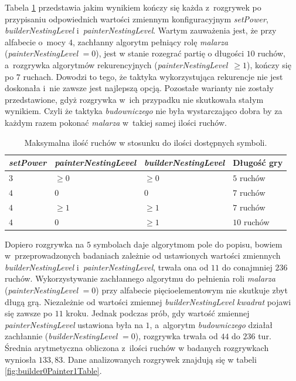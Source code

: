 \documentclass[document]{xmgr}
\begin{document}
Tabela \ref{fig:maxGameLength} przedstawia jakim wynikiem kończy się każda z~rozgrywek po przypisaniu odpowiednich wartości zmiennym konfiguracyjnym \emph{setPower}, \emph{builderNestingLevel} i~\emph{painterNestingLevel}. Wartym zauważenia jest, że przy alfabecie o~mocy $4$, zachłanny algorytm pełniący rolę \emph{malarza} (\emph{painterNestingLevel} $=0$), jest w stanie rozegrać partię o długości $10$ ruchów, a~rozgrywka algorytmów rekurencyjnych \mbox{(\emph{painterNestingLevel} $\geq 1$)}, kończy się po $7$ ruchach. Dowodzi to tego, że taktyka wykorzystująca rekurencje nie jest doskonała i~nie zawsze jest najlepszą opcją. Pozostałe warianty nie zostały przedstawione, gdyż rozgrywka w~ich przypadku nie skutkowała stałym wynikiem. Czyli że taktyka \emph{budowniczego} nie była wystarczająco dobra by za każdym razem pokonać \emph{malarza} w~takiej samej ilości ruchów.

\begin{table}[tbh]
    \centering
	\caption{Maksymalna ilość ruchów w stosunku do ilości dostępnych symboli.}
	\begin{tabular}{|l|l|l|l|} \hline
	\emph{setPower} & \emph{painterNestingLevel} & \emph{builderNestingLevel} & Długość gry \\ \hline
	$3$ & $\geq 0$ & $\geq 0$ & $5$ ruchów\\ \hline
	$4$ & $0$ & $0$ & $7$ ruchów\\ \hline
	$4$ & $\geq 1 $ & $\geq 1$ & $7$ ruchów\\ \hline
	$4$ & $0$ & $\geq 1$ & $10$ ruchów\\ \hline
	\end{tabular}
	\label{fig:maxGameLength}
\end{table}




Dopiero rozgrywka na $5$ symbolach daje algorytmom pole do popisu, bowiem w~przeprowadzonych badaniach zależnie od ustawionych wartości zmiennych \emph{builderNestingLevel} i~\emph{painterNestingLevel}, trwała ona od $11$ do conajmniej $236$ ruchów. Wykorzystywanie zachłannego algorytmu do pełnienia roli \emph{malarza} (\emph{painterNestingLevel} $=0$) przy alfabecie pięcioelementowym nie skutkuje zbyt długą grą. Niezależnie od wartości zmiennej \emph{builderNestingLevel} \emph{kwadrat} pojawi się zawsze po $11$ kroku. Jednak podczas prób, gdy wartość zmiennej \emph{painterNestingLevel} ustawiona była na $1$, a~algorytm \emph{budowniczego} działał zachłannie (\emph{builderNestingLevel} $=0$), rozgrywka trwała od $44$ do $236$ tur. Średnia arytmetyczna obliczona z~ilości ruchów w badanych rozgrywkach wyniosła $133,83$. Dane analizowanych rozgrywek znajdują się w tabeli \ref{fig:builder0Painter1Table}.
\end{document}
